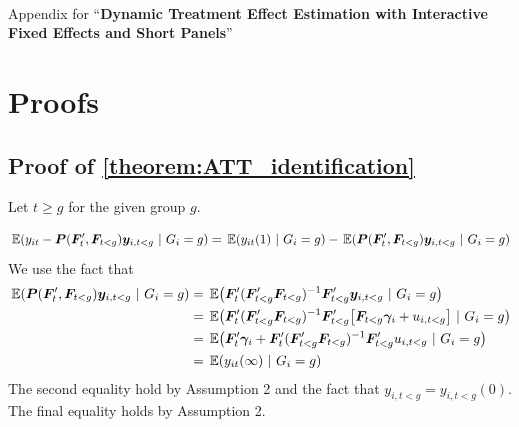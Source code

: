 \documentclass[12pt]{article}
\begin{document}




\newpage~\appendix

\begin{center}
    Appendix for ``\textbf{Dynamic Treatment Effect Estimation with Interactive Fixed Effects and Short Panels}''
\end{center}

\section{Proofs}\label{sec:proofs}



\subsection*{Proof of \autoref{theorem:ATT_identification}}

Let $t \geq g$ for the given group $g$.

\begin{equation*}
    \expec{y_{it} - \bm P(\bm{F}_{t}', \bm{F}_{t < g}) \bm y_{i,t < g}}{G_i = g} = \expec{y_{it}(1)}{G_i = g} - \expec{\bm P(\bm{F}_{t}', \bm{F}_{t < g}) \bm y_{i,t < g}}{G_i = g} 
\end{equation*}
We use the fact that 
\begin{align*}
    \expec{ \bm P(\bm{F}_{t}', \bm{F}_{t < g}) \bm y_{i,t < g} }{G_i = g} 
    &= \expec{ \bm{F}_{t}' (\bm{F}_{t < g}' \bm{F}_{t < g})^{-1} \bm{F}_{t < g}' \bm y_{i,t < g} }{G_i = g} \\
    &= \expec{ \bm{F}_{t}' (\bm{F}_{t < g}' \bm{F}_{t < g})^{-1} \bm{F}_{t < g}' \big[\bm{F}_{t < g} \bm \gamma_i + u_{i,t < g} \big] }{G_i = g} \\
    &= \expec{ \bm{F}_{t}' \bm \gamma_i + \bm{F}_{t}' (\bm{F}_{t < g}' \bm{F}_{t < g})^{-1} \bm{F}_{t < g}' u_{i,t < g} }{G_i = g} \\
    &= \expec{ y_{it}(\infty) }{G_i = g} 
\end{align*}
The second equality hold by Assumption 2 and the fact that $y_{i,t < g} = y_{i, t < g}(0)$. The final equality holds by Assumption 2.
\end{document}
